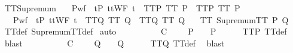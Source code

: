 \begin{isabellebody}
%
\isadelimproof
\isanewline
%
\endisadelimproof
\isanewline
{}\isamarkupfalse%
\ TT{}{\isacharunderscore}Supremum{\isacharcolon}\isanewline
\ \ \ P{\isacharunderscore}wf{\isacharcolon}\ {\isachardoublequoteopen}{\isasymforall}\ t{\isasymin}P{\isachardot}\ ttWF\ t{\isachardoublequoteclose}\ \ TT{}{\isacharunderscore}P{\isacharcolon}\ {\isachardoublequoteopen}TT{}\ P{\isachardoublequoteclose}\ \ TT{}{\isacharunderscore}P{\isacharcolon}\ {\isachardoublequoteopen}TT{}\ P{\isachardoublequoteclose}\isanewline
\ \ \ P{\isacharunderscore}wf{\isacharcolon}\ {\isachardoublequoteopen}{\isasymforall}\ t{\isasymin}P{\isachardot}\ ttWF\ t{\isachardoublequoteclose}\ \ TT{}{\isacharunderscore}Q{\isacharcolon}\ {\isachardoublequoteopen}TT{}\ Q{\isachardoublequoteclose}\ \ TT{}{\isacharunderscore}Q{\isacharcolon}\ {\isachardoublequoteopen}TT{}\ Q{\isachardoublequoteclose}\isanewline
\ \ \ {\isachardoublequoteopen}TT{}\ {\isacharparenleft}SupremumTT\ P\ Q{\isacharparenright}{\isachardoublequoteclose}\isanewline
%
\isadelimproof
\ \ %
\endisadelimproof
%
\isatagproof
{}\isamarkupfalse%
\ TT{}{\isacharunderscore}def\ SupremumTT{\isacharunderscore}def\isanewline
{}\isamarkupfalse%
\ auto\isanewline
\ \ \isamarkupfalse%
\ {\isasymrho}\ {\isasymsigma}\isanewline
\ \ \isamarkupfalse%
\ {\isachardoublequoteopen}{\isasymrho}\ {\isasymlesssim}\isactrlsub C\ {\isasymsigma}\ {\isasymLongrightarrow}\ {\isasymsigma}\ {\isasymin}\ P\ {\isasymLongrightarrow}\ {\isasymrho}\ {\isasymin}\ P{\isachardoublequoteclose}\isanewline
\ \ \ \ \isamarkupfalse%
\ TT{}{\isacharunderscore}P\ TT{}{\isacharunderscore}def\ \isamarkupfalse%
\ blast\isanewline
{}\isamarkupfalse%
\isanewline
\ \ \isamarkupfalse%
\ {\isasymrho}\ {\isasymsigma}\isanewline
\ \ \isamarkupfalse%
\ {\isachardoublequoteopen}{\isasymrho}\ {\isasymlesssim}\isactrlsub C\ {\isasymsigma}\ {\isasymLongrightarrow}\ {\isasymsigma}\ {\isasymin}\ Q\ {\isasymLongrightarrow}\ {\isasymrho}\ {\isasymin}\ Q{\isachardoublequoteclose}\isanewline
\ \ \ \ \isamarkupfalse%
\ TT{}{\isacharunderscore}Q\ TT{}{\isacharunderscore}def\ \isamarkupfalse%
\ blast\isanewline

\end{isabellebody}
